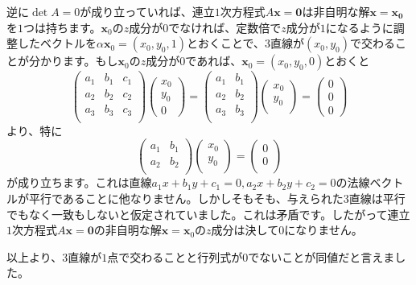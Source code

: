 逆に$\det A = 0$が成り立っていれば、連立$1$次方程式$A\bm{x} = \bm{0}$は非自明な解$\bm{x} = \bm{x_0}$を$1$つは持ちます。$\bm{x}_0$の$z$成分が$0$でなければ、定数倍で$z$成分が$1$になるように調整したベクトルを$\alpha \bm{x}_0 = (x_0, y_0, 1)$とおくことで、$3$直線が$(x_0, y_0)$で交わることが分かります。もし$\bm{x}_0$の$z$成分が$0$であれば、$\bm{x}_0 = (x_0, y_0, 0)$とおくと
\[
\begin{pmatrix}
a_1 & b_1 & c_1 \\
a_2 & b_2 & c_2 \\
a_3 & b_3 & c_3 \\
\end{pmatrix}
\begin{pmatrix}
x_0 \\
y_0 \\
0
\end{pmatrix}
=
\begin{pmatrix}
a_1 & b_1 \\
a_2 & b_2 \\
a_3 & b_3 \\
\end{pmatrix}
\begin{pmatrix}
x_0 \\
y_0 \\
\end{pmatrix}
=
\begin{pmatrix}
0 \\
0 \\
0
\end{pmatrix}
\]
より、特に
\[
\begin{pmatrix}
a_1 & b_1 \\
a_2 & b_2 \\
\end{pmatrix}
\begin{pmatrix}
x_0 \\
y_0 \\
\end{pmatrix}
=
\begin{pmatrix}
0 \\
0 \\
\end{pmatrix}
\]
が成り立ちます。これは直線$a_1 x + b_1 y + c_1 = 0, a_2 x + b_2 y + c_2 = 0$の法線ベクトルが平行であることに他なりません。しかしそもそも、与えられた$3$直線は平行でもなく一致もしないと仮定されていました。これは矛盾です。したがって連立$1$次方程式$A \bm{x} = \bm{0}$の非自明な解$\bm{x} = \bm{x}_0$の$z$成分は決して$0$になりません。

以上より、$3$直線が$1$点で交わることと行列式が$0$でないことが同値だと言えました。

